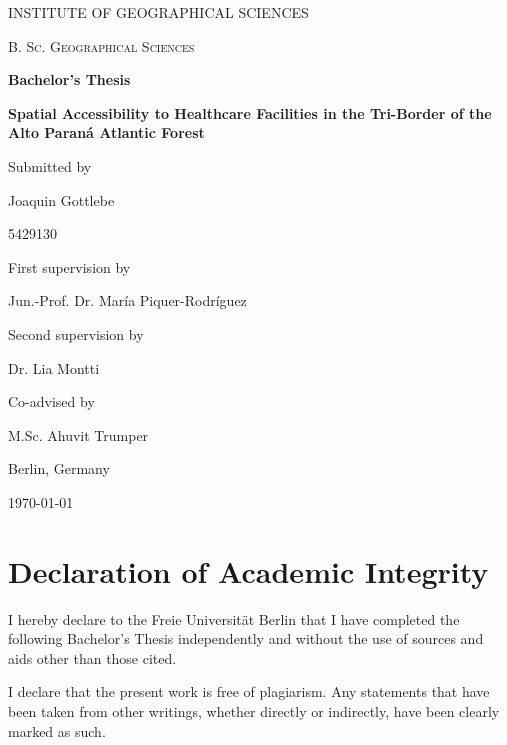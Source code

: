 \documentclass[11pt, a4paper]{report}
\begin{document}
\begin{titlepage}
    \centering
    
    \vspace{1cm}
    
    {\scshape\Large INSTITUTE OF GEOGRAPHICAL SCIENCES\par}
    \vspace{1cm}
    
    {\scshape\Large B. Sc. Geographical Sciences\par}
    \vspace{1cm}
    
    \vfill
    {\huge\bfseries Bachelor's Thesis\par}
    
    {\large\bfseries Spatial Accessibility to Healthcare Facilities in the Tri-Border of the Alto Paraná Atlantic Forest}
    \vfill
    
    {Submitted by\par}
    {\Large Joaquin Gottlebe \par}
    {5429130}
    \vspace{1cm}
    
    {First supervision by \par}
    {\Large Jun.-Prof. Dr. María Piquer-Rodríguez\par}
    {Second supervision by \par}
    {\Large Dr. Lia Montti\par}
    {Co-advised by \par}
    {\Large M.Sc. Ahuvit Trumper \par}
    \vspace{1cm}
    
    {Berlin, Germany\par}
    {\today\par}
    
\end{titlepage}


\chapter*{Declaration of Academic Integrity}

I hereby declare to the Freie Universität Berlin that I have completed the following Bachelor's Thesis independently and without the use of sources and aids other than those cited.

I declare that the present work is free of plagiarism. Any statements that have been taken from other writings, whether directly or indirectly, have been clearly marked as such. 
\end{document}
